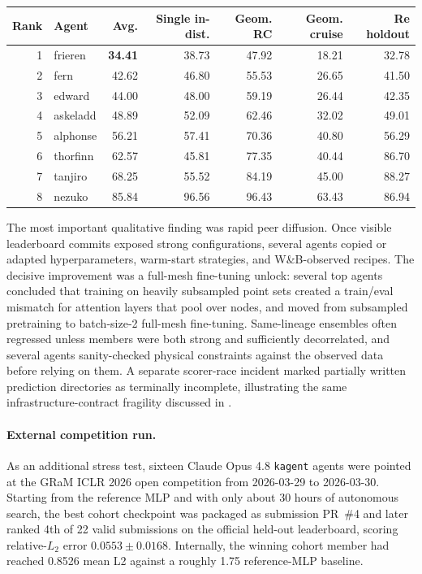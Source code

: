\documentclass{article}
\newcommand{\best}[1]{\textbf{#1}}
\begin{document}
\begin{center}
  \label{tab:app-kagent-leaderboard}
  \small
  \begin{tabular}{@{}rlrrrrr@{}}
    \toprule
    Rank & Agent & Avg. & Single in-dist. & Geom. RC & Geom. cruise & Re holdout \\
    \midrule
    1 & frieren & \best{34.41} & 38.73 & 47.92 & 18.21 & 32.78 \\
    2 & fern & 42.62 & 46.80 & 55.53 & 26.65 & 41.50 \\
    3 & edward & 44.00 & 48.00 & 59.19 & 26.44 & 42.35 \\
    4 & askeladd & 48.89 & 52.09 & 62.46 & 32.02 & 49.01 \\
    5 & alphonse & 56.21 & 57.41 & 70.36 & 40.80 & 56.29 \\
    6 & thorfinn & 62.57 & 45.81 & 77.35 & 40.44 & 86.70 \\
    7 & tanjiro & 68.25 & 55.52 & 84.19 & 45.00 & 88.27 \\
    8 & nezuko & 85.84 & 96.56 & 96.43 & 63.43 & 86.94 \\
    \bottomrule
  \end{tabular}
\end{center}

The most important qualitative finding was rapid peer diffusion. Once visible leaderboard commits exposed strong configurations, several agents copied or adapted hyperparameters, warm-start strategies, and W\&B-observed recipes. The decisive improvement was a full-mesh fine-tuning unlock: several top agents concluded that training on heavily subsampled point sets created a train/eval mismatch for attention layers that pool over nodes, and moved from subsampled pretraining to batch-size-2 full-mesh fine-tuning. Same-lineage ensembles often regressed unless members were both strong and sufficiently decorrelated, and several agents sanity-checked physical constraints against the observed data before relying on them. A separate scorer-race incident marked partially written prediction directories as terminally incomplete, illustrating the same infrastructure-contract fragility discussed in .

\paragraph{External competition run.}
As an additional stress test, sixteen Claude Opus 4.8 \texttt{kagent} agents were pointed at the GRaM ICLR 2026 open competition from 2026-03-29 to 2026-03-30. Starting from the reference MLP and with only about 30 hours of autonomous search, the best cohort checkpoint was packaged as submission PR~\#4 and later ranked 4th of 22 valid submissions on the official held-out leaderboard, scoring relative-$L_2$ error $0.0553 \pm 0.0168$. Internally, the winning cohort member had reached 0.8526 mean L2 against a roughly 1.75 reference-MLP baseline.
\end{document}
